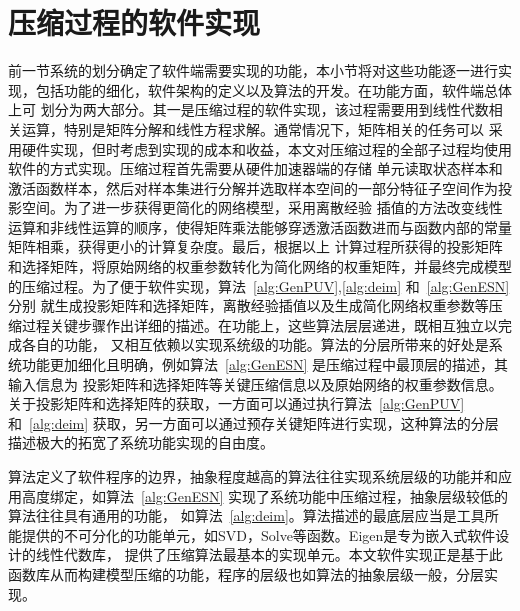 \section{压缩过程的软件实现}
前一节系统的划分确定了软件端需要实现的功能，本小节将对这些功能逐一进行实现，包括功能的细化，软件架构的定义以及算法的开发。在功能方面，软件端总体上可
划分为两大部分。其一是压缩过程的软件实现，该过程需要用到线性代数相关运算，特别是矩阵分解和线性方程求解。通常情况下，矩阵相关的任务可以
采用硬件实现，但时考虑到实现的成本和收益，本文对压缩过程的全部子过程均使用软件的方式实现。压缩过程首先需要从硬件加速器端的存储
单元读取状态样本和激活函数样本，然后对样本集进行分解并选取样本空间的一部分特征子空间作为投影空间。为了进一步获得更简化的网络模型，采用离散经验
插值的方法改变线性运算和非线性运算的顺序，使得矩阵乘法能够穿透激活函数进而与函数内部的常量矩阵相乘，获得更小的计算复杂度。最后，根据以上
计算过程所获得的投影矩阵和选择矩阵，将原始网络的权重参数转化为简化网络的权重矩阵，并最终完成模型的压缩过程。为了便于软件实现，算法~\ref{alg:GenPUV},\ref{alg:deim} 和~\ref{alg:GenESN} 分别
就生成投影矩阵和选择矩阵，离散经验插值以及生成简化网络权重参数等压缩过程关键步骤作出详细的描述。在功能上，这些算法层层递进，既相互独立以完成各自的功能，
又相互依赖以实现系统级的功能。算法的分层所带来的好处是系统功能更加细化且明确，例如算法~\ref{alg:GenESN} 是压缩过程中最顶层的描述，其输入信息为
投影矩阵和选择矩阵等关键压缩信息以及原始网络的权重参数信息。关于投影矩阵和选择矩阵的获取，一方面可以通过执行算法~\ref{alg:GenPUV} 和~\ref{alg:deim} 
获取，另一方面可以通过预存关键矩阵进行实现，这种算法的分层描述极大的拓宽了系统功能实现的自由度。


算法定义了软件程序的边界，抽象程度越高的算法往往实现系统层级的功能并和应用高度绑定，如算法~\ref{alg:GenESN} 实现了系统功能中压缩过程，抽象层级较低的算法往往具有通用的功能，
如算法~\ref{alg:deim}。算法描述的最底层应当是工具所能提供的不可分化的功能单元，如SVD，Solve等函数。Eigen是专为嵌入式软件设计的线性代数库，
提供了压缩算法最基本的实现单元。本文软件实现正是基于此函数库从而构建模型压缩的功能，程序的层级也如算法的抽象层级一般，分层实现。

